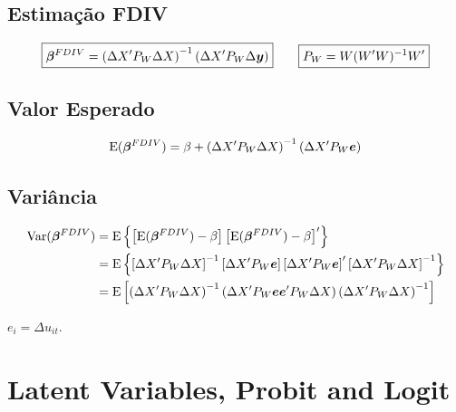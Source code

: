 \documentclass[11pt, oneside, a4paper, article]{article}
\numberwithin{equation}{section}
\begin{document}
\begin{description}
\begin{description}
\subsection*{Estimação FDIV}

\vspace{-1 em}
\begin{align*}
\boxed{
\boldsymbol{\beta}^{FDIV} =  
\left(
\Delta X' P_{W} \Delta X 
\right)^{-1}
\left(
\Delta X' P_{W} \Delta \boldsymbol{y}
\right)
}
\qquad
\boxed{
P_{W} = W(W'W)^{-1}W'}
\end{align*}

\subsection*{Valor Esperado}

\vspace{-1 em}
\begin{align*}
\text{E}( \boldsymbol{\beta}^{FDIV} ) =  
\beta + 
\left( \Delta X' P_{W} \Delta X \right)^{-1}
\left( \Delta X' P_{W} \boldsymbol{e} \right)
\end{align*}

\subsection*{Variância}

\vspace{-1 em}
\begin{align*}
\text{Var}( \boldsymbol{\beta}^{FDIV} ) &=
\text{E}\left\{  
\left[ \text{E}( \boldsymbol{\beta}^{FDIV} ) - \beta \right] 
\left[ \text{E}( \boldsymbol{\beta}^{FDIV} ) - \beta \right]'
\right\}
\\
&=
\text{E}\left\{  
\left[ \Delta X' P_{W} \Delta X \right]^{-1}
\left[ \Delta X' P_{W} \boldsymbol{e} \right]
\left[ \Delta X' P_{W} \boldsymbol{e} \right]'
\left[ \Delta X' P_{W} \Delta X \right]^{-1}
\right\}
\\
&=
\text{E}\left[
\left( \Delta X' P_{W} \Delta X \right)^{-1}
\left( \Delta X' P_{W} \boldsymbol{e} \boldsymbol{e}' P_{W} \Delta X \right)
\left( \Delta X' P_{W} \Delta X \right)^{-1}
\right]
\end{align*}

\noindent
$e_{i} = \Delta u_{it}$.

\clearpage
\section{Latent Variables, Probit and Logit}


\end{description}
\end{description}
\end{document}
